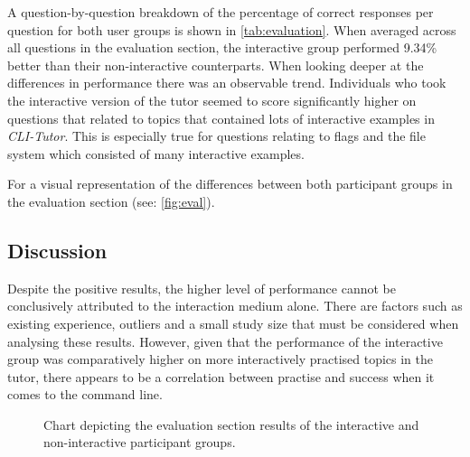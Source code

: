 A question-by-question breakdown of the percentage of correct responses per
question for both user groups is shown in \autoref{tab:evaluation}. When
averaged across all questions in the evaluation section, the interactive group
performed 9.34\% better than their non-interactive counterparts. When looking
deeper at the differences in performance there was an observable trend.
Individuals who took the interactive version of the tutor seemed to score
significantly higher on questions that related to topics that contained lots of
interactive examples in \textit{CLI-Tutor}. This is especially true for
questions relating to flags and the file system which consisted of many
interactive examples.

For a visual representation of the differences between both participant groups
in the evaluation section (see: \autoref{fig:eval}).

\subsection{Discussion}

Despite the positive results, the higher level of performance cannot be
conclusively attributed to the interaction medium alone. There are factors such
as existing experience, outliers and a small study size that must be considered
when analysing these results. However, given that the performance of the
interactive group was comparatively higher on more interactively practised
topics in the tutor, there appears to be a correlation between practise and
success when it comes to the command line.



\begin{figure}[htbp]
	\centering
	\caption{Chart depicting the evaluation section results of the interactive and non-interactive participant groups.}
	\label{fig:eval}
\end{figure}

